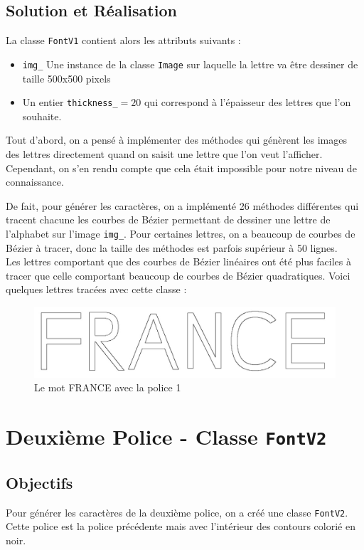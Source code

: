 \documentclass[a4paper, 12pt]{article}
\begin{document}
\subsection{Solution et Réalisation}
La classe \texttt{FontV1} contient alors les attributs suivants : 
\begin{itemize}
\item \texttt{img\_} Une instance de la classe \texttt{Image} sur laquelle la lettre va être dessiner de taille 500x500 pixels
\item Un entier \texttt{thickness\_}$= 20$ qui correspond à l'épaisseur des lettres que l'on souhaite. 
\end{itemize}
\vspace{0.5cm}

Tout d'abord, on a pensé à implémenter des méthodes qui génèrent les images des lettres directement quand on saisit une lettre que l'on veut l'afficher. Cependant, on s'en rendu compte que cela était impossible pour notre niveau de connaissance.

De fait, pour générer les caractères, on a implémenté 26 méthodes différentes qui tracent chacune les courbes de Bézier permettant de dessiner une lettre de l'alphabet sur l'image \texttt{img\_}. Pour certaines lettres, on a beaucoup de courbes de Bézier à tracer, donc la taille des méthodes est parfois supérieur à 50 lignes.\\

Les lettres comportant que des courbes de Bézier linéaires ont été plus faciles à tracer que celle comportant beaucoup de courbes de Bézier quadratiques. Voici quelques lettres tracées avec cette classe : 

\begin{figure}[h]
\centering
\includegraphics[scale=0.5]{Images/FRANCE_FontV1.jpeg}
\caption{Le mot FRANCE avec la police 1}
\label{fig3}
\end{figure}

\newpage
\section{Deuxième Police - Classe \texttt{FontV2}}	
\subsection{Objectifs	}
Pour générer les caractères de la deuxième police, on a créé une classe \texttt{FontV2}. Cette police est la police précédente mais avec l'intérieur des contours colorié en noir.
\end{document}
